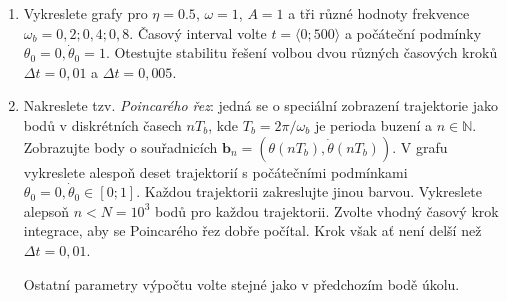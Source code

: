 \documentclass[a4paper,11pt,twoside]{article}
\def\vector#1{\boldsymbol{#1}}								%
\def\c{,\!}
\begin{document}
\begin{enumerate}
    \item 
        Vykreslete grafy pro $\eta=0.5$, $\omega=1$, $A=1$ a tři různé hodnoty frekvence $\omega_b=0\c2;0\c4;0\c8$. Časový interval volte $t=\langle0;500\rangle$ a počáteční podmínky $\theta_0=0,\dot{\theta}_{0}=1$.
        Otestujte stabilitu řešení volbou dvou různých časových kroků $\Delta t=0\c01$ a $\Delta t=0\c005$.

    \item Nakreslete tzv. \emph{Poincarého řez}:
        jedná se o speciální zobrazení trajektorie jako bodů v diskrétních časech $nT_b$, kde $T_b=2\pi/\omega_b$ je perioda buzení a $n\in\mathbb{N}$.
        Zobrazujte body o souřadnicích $\vector{b}_{n}=\left(\theta(nT_b),\dot{\theta}(nT_{b})\right)$.
        V grafu vykreslete alespoň deset trajektorií s počátečními podmínkami $\theta_0=0,\dot{\theta}_{0}\in\left[0;1\right]$. 
        Každou trajektorii zakreslujte jinou barvou.
        Vykreslete alepsoň $n<N=10^{3}$ bodů pro každou trajektorii.
        Zvolte vhodný časový krok integrace, aby se Poincarého řez dobře počítal.
        Krok však ať není delší než $\Delta t=0\c01$.

        Ostatní parametry výpočtu volte stejné jako v předchozím bodě úkolu.
    \end{enumerate}
\end{document}
